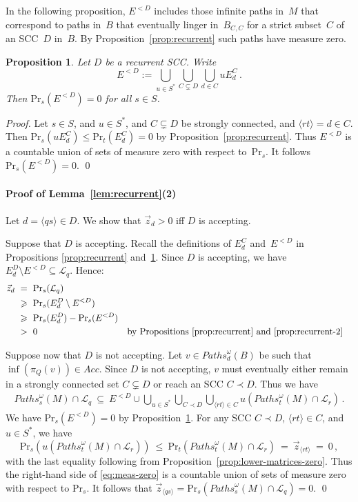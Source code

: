\documentclass{elsarticle}
\newtheorem{proposition}[definition]{Proposition}
\def\<{\langle}
\def\>{\rangle}
\def\cL{\mathcal{L}}
\def\Pr{\mathrm{Pr}}
\def\Paths{\mathit{Paths}}
\def\Acc{\mathit{Acc}}
\begin{document}
In the following proposition, $E^{<D}$ includes those infinite paths in~$M$ that correspond to paths in~$B$ that eventually linger in~$B_{C,C}$ for a strict subset~$C$ of an SCC~$D$ in~$B$.
By Proposition~\ref{prop:recurrent} such paths have measure zero.
\begin{proposition}
Let $D$ be a recurrent SCC.
Write
\[ E^{<D} := \bigcup_{u \in S^*} \bigcup_{C \subsetneq D} \bigcup_{d \in C} u E^C_d \, . \]
Then $\Pr_s(E^{<D})=0$ for all $s \in S$.
\label{prop:recurrent-2}
\end{proposition}
\begin{proof}
Let $s \in S$, and $u \in S^*$, and $C \subsetneq D$ be strongly connected, and $\<r t\> = d \in C$.
Then $\Pr_s(u E^C_d) \leqslant \Pr_t(E^C_d) = 0$ by Proposition~\ref{prop:recurrent}.
Thus $E^{<D}$ is a countable union of sets of measure zero with respect to~$\Pr_s$.
It follows $\Pr_s(E^{<D})=0$.
\qed
\end{proof}


\paragraph{Proof of Lemma~\ref{lem:recurrent}(2)}
Let $d = \< q s \> \in D$.
We show that $\vec{z}_d > 0$ iff $D$ is accepting.

Suppose that $D$ is accepting.
Recall the definitions of $E_d^C$ and~$E^{<D}$ in Propositions \ref{prop:recurrent} and~\ref{prop:recurrent-2}.
Since $D$ is accepting, we have $E_d^D \setminus E^{<D} \subseteq \cL_q$.
Hence:
\begin{align*}
\vec{z}_d
& \ = \ \Pr_s(\cL_q) \\
& \ \geqslant \ \Pr_s(E_d^D \setminus E^{<D}) &&\\
& \ \geqslant \ \Pr_s(E_d^D) - \Pr_s(E^{<D}) && \\
  & \ > \ 0  && \text{by Propositions \ref{prop:recurrent} and~\ref{prop:recurrent-2}}
\end{align*}

Suppose now that $D$ is not accepting.  Let $v \in \Paths_d^\omega(B)$
be such that $\inf(\pi_Q(v)) \in \Acc$.  Since $D$ is not accepting,
$v$ must eventually either remain in a strongly connected set $C
\subsetneq D$ or reach an SCC $C \prec D$.  Thus we have
\begin{gather}
\Paths_s^\omega(M)\cap \cL_q \ \subseteq \ E^{<D} \cup
\bigcup_{u\in S^*} \bigcup_{C \prec D}\bigcup_{\<r t\> \in C}
u ( \Paths_t^\omega(M) \cap \cL_r ) \,.
\label{eq:meas-zero}
\end{gather}
We have $\Pr_s(E^{<D}) = 0$ by Proposition~\ref{prop:recurrent-2}.
For any SCC $C \prec D$, $\<r t\> \in C$, and $u\in S^*$, we
have
\[ \Pr_s(u ( \Paths_t^\omega(M) \cap \cL_r ) ) \ \leqslant \ \Pr_t( \Paths_t^\omega(M) \cap \cL_r ) \ = \
  \vec{z}_{\<r t\>} \ = \ 0 \, , \] with the last equality following from
Proposition~\ref{prop:lower-matrices-zero}.  Thus the right-hand side
of \eqref{eq:meas-zero} is a countable union of sets of measure zero
with respect to $\Pr_s$.  It follows that
$\vec{z}_{\<q s\>} = \Pr_s(\Paths_s^\omega(M)\cap \cL_q)=0$.
\qed
\end{document}
